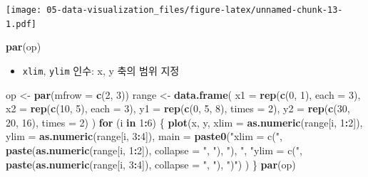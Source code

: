 \documentclass[
  11pt,
]{krantz}
\newenvironment{Shaded}{\begin{snugshade}}{\end{snugshade}}
\newcommand{\ControlFlowTok}[1]{\textcolor[rgb]{0.27,0.27,0.27}{\textbf{#1}}}
\newcommand{\DataTypeTok}[1]{\textcolor[rgb]{0.27,0.27,0.27}{#1}}
\newcommand{\DecValTok}[1]{\textcolor[rgb]{0.06,0.06,0.06}{#1}}
\newcommand{\KeywordTok}[1]{\textcolor[rgb]{0.27,0.27,0.27}{\textbf{#1}}}
\newcommand{\NormalTok}[1]{#1}
\newcommand{\OperatorTok}[1]{\textcolor[rgb]{0.43,0.43,0.43}{\textbf{#1}}}
\newcommand{\StringTok}[1]{\textcolor[rgb]{0.5,0.5,0.5}{#1}}
\providecommand{\tightlist}{%
  \setlength{\itemsep}{0pt}\setlength{\parskip}{0pt}}
\begin{document}
\texttt{[image: 05-data-visualization\_files/figure-latex/unnamed-chunk-13-1.pdf]}

\begin{Shaded}
\begin{Highlighting}[]
\KeywordTok{par}\NormalTok{(op)}
\end{Highlighting}
\end{Shaded}

\normalsize

\begin{itemize}
\tightlist
\item
  \texttt{xlim}, \texttt{ylim} 인수: x, y 축의 범위 지정
\end{itemize}

\footnotesize

\begin{Shaded}
\begin{Highlighting}[]
\NormalTok{op <-}\StringTok{ }\KeywordTok{par}\NormalTok{(}\DataTypeTok{mfrow =} \KeywordTok{c}\NormalTok{(}\DecValTok{2}\NormalTok{, }\DecValTok{3}\NormalTok{))}
\NormalTok{range <-}\StringTok{ }\KeywordTok{data.frame}\NormalTok{(}
  \DataTypeTok{x1 =} \KeywordTok{rep}\NormalTok{(}\KeywordTok{c}\NormalTok{(}\DecValTok{0}\NormalTok{, }\DecValTok{1}\NormalTok{), }\DataTypeTok{each =} \DecValTok{3}\NormalTok{),}
  \DataTypeTok{x2 =} \KeywordTok{rep}\NormalTok{(}\KeywordTok{c}\NormalTok{(}\DecValTok{10}\NormalTok{, }\DecValTok{5}\NormalTok{), }\DataTypeTok{each =} \DecValTok{3}\NormalTok{), }
  \DataTypeTok{y1 =} \KeywordTok{rep}\NormalTok{(}\KeywordTok{c}\NormalTok{(}\DecValTok{0}\NormalTok{, }\DecValTok{5}\NormalTok{, }\DecValTok{8}\NormalTok{), }\DataTypeTok{times =} \DecValTok{2}\NormalTok{), }
  \DataTypeTok{y2 =} \KeywordTok{rep}\NormalTok{(}\KeywordTok{c}\NormalTok{(}\DecValTok{30}\NormalTok{, }\DecValTok{20}\NormalTok{, }\DecValTok{16}\NormalTok{), }\DataTypeTok{times =} \DecValTok{2}\NormalTok{)}
\NormalTok{  )}
\ControlFlowTok{for}\NormalTok{ (i }\ControlFlowTok{in} \DecValTok{1}\OperatorTok{:}\DecValTok{6}\NormalTok{) \{}
  \KeywordTok{plot}\NormalTok{(x, y, }
       \DataTypeTok{xlim =} \KeywordTok{as.numeric}\NormalTok{(range[i, }\DecValTok{1}\OperatorTok{:}\DecValTok{2}\NormalTok{]), }
       \DataTypeTok{ylim =} \KeywordTok{as.numeric}\NormalTok{(range[i, }\DecValTok{3}\OperatorTok{:}\DecValTok{4}\NormalTok{]), }
       \DataTypeTok{main =} \KeywordTok{paste0}\NormalTok{(}\StringTok{"xlim = c("}\NormalTok{, }
                     \KeywordTok{paste}\NormalTok{(}\KeywordTok{as.numeric}\NormalTok{(range[i, }\DecValTok{1}\OperatorTok{:}\DecValTok{2}\NormalTok{]), }
                           \DataTypeTok{collapse =} \StringTok{", "}\NormalTok{), }\StringTok{"), "}\NormalTok{, }
                     \StringTok{"ylim = c("}\NormalTok{, }
                     \KeywordTok{paste}\NormalTok{(}\KeywordTok{as.numeric}\NormalTok{(range[i, }\DecValTok{3}\OperatorTok{:}\DecValTok{4}\NormalTok{]), }
                           \DataTypeTok{collapse =} \StringTok{", "}\NormalTok{), }\StringTok{")"}\NormalTok{)}
\NormalTok{       )}
\NormalTok{\}}
\KeywordTok{par}\NormalTok{(op)}
\end{Highlighting}
\end{Shaded}
\end{document}
